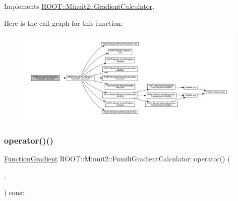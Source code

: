 Implements \mbox{\hyperlink{classROOT_1_1Minuit2_1_1GradientCalculator_a1809c1e8a89d32aabf7835e9690c2916}{R\+O\+O\+T\+::\+Minuit2\+::\+Gradient\+Calculator}}.

Here is the call graph for this function\+:
\nopagebreak
\begin{figure}[H]
\begin{center}
\leavevmode
\includegraphics[width=350pt]{d8/de6/classROOT_1_1Minuit2_1_1FumiliGradientCalculator_a652f65091b404ebda9a645d7ba92b3b6_cgraph}
\end{center}
\end{figure}
\mbox{\label{classROOT_1_1Minuit2_1_1FumiliGradientCalculator_a652f65091b404ebda9a645d7ba92b3b6}} 
\subsubsection{\texorpdfstring{operator()()}{operator()()}\hspace{0.1cm}{\footnotesize\ttfamily [5/6]}}
{\footnotesize\ttfamily \mbox{\hyperlink{classROOT_1_1Minuit2_1_1FunctionGradient}{Function\+Gradient}} R\+O\+O\+T\+::\+Minuit2\+::\+Fumili\+Gradient\+Calculator\+::operator() (\begin{DoxyParamCaption}\item[{const \mbox{\hyperlink{classROOT_1_1Minuit2_1_1MinimumParameters}{Minimum\+Parameters}} \&}]{,  }\item[{const \mbox{\hyperlink{classROOT_1_1Minuit2_1_1FunctionGradient}{Function\+Gradient}} \&}]{ }\end{DoxyParamCaption}) const\hspace{0.3cm}{\ttfamily [virtual]}}



